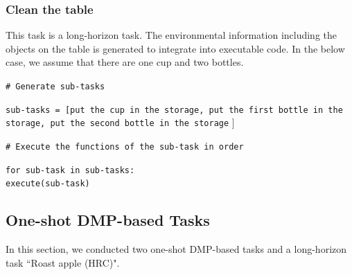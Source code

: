 \documentclass[letterpaper,conference]{ieeeconf}
\begin{document}
\subsubsection{Clean the table}
This task is a long-horizon task. The environmental information including the objects on the table is generated to integrate into executable code. In the below case, we assume that there are one cup and two bottles. 
\begin{codebox}
\textcolor{codegreen}{\footnotesize \texttt{\# Generate sub-tasks}}\vspace*{1mm}\\
\colorbox{codeblue}{%
    \begin{minipage}{\dimexpr\textwidth-6pt\relax}
        \footnotesize \texttt{sub-tasks = [\textquotesingle put the cup in the storage\textquotesingle , \textquotesingle put the first bottle in the storage\textquotesingle , \textquotesingle put the second bottle in the storage\textquotesingle} ]
    \end{minipage}%
}
\textcolor{codegreen}{\footnotesize \texttt{\# Execute the functions of the sub-task in order}\vspace{1mm}}\\
\colorbox{longhri}{%
    \begin{minipage}{\dimexpr\textwidth-6pt\relax}
        \footnotesize \texttt{for sub-task in sub-tasks:\\
            \hspace*{0.5cm}execute(sub-task)}
    \end{minipage}%
}
\end{codebox}
\vspace{-1.5mm}
\subsection{One-shot DMP-based Tasks}
In this section, we conducted two one-shot DMP-based tasks and a long-horizon task ``Roast apple (HRC)".
\end{document}
